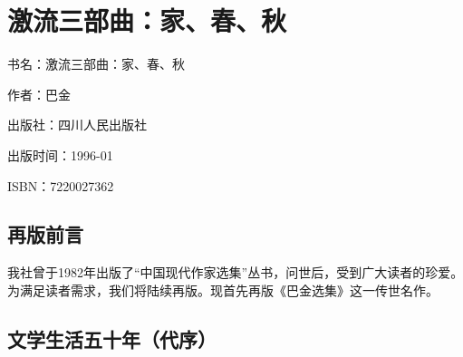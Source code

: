 



\section{激流三部曲：家、春、秋}

\par 书名：激流三部曲：家、春、秋
\par 作者：巴金
\par 出版社：四川人民出版社
\par 出版时间：1996-01
\par ISBN：7220027362



\subsection{再版前言}

\par 我社曾于1982年出版了“中国现代作家选集”丛书，问世后，受到广大读者的珍爱。为满足读者需求，我们将陆续再版。现首先再版《巴金选集》这一传世名作。



\subsection{文学生活五十年（代序）}

